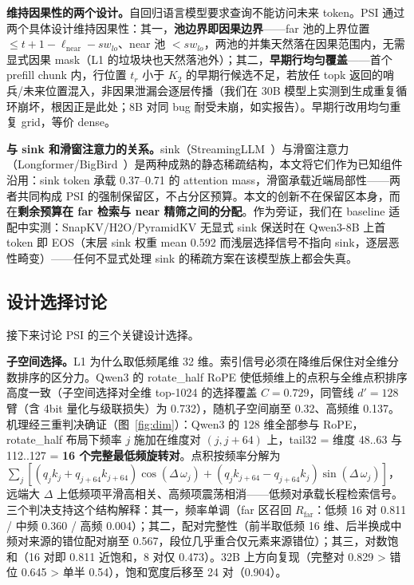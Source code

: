 \documentclass[11pt]{article}
\begin{document}
\textbf{维持因果性的两个设计。}自回归语言模型要求查询不能访问未来 token。PSI 通过两个具体设计维持因果性：其一，\textbf{池边界即因果边界}——far 池的上界位置 $\leq t+1-\ell_{\mathrm{near}}-sw_{lo}$、near 池 $< sw_{lo}$，两池的并集天然落在因果范围内，无需显式因果 mask（L1 的垃圾块也天然落池外）；其二，\textbf{早期行均匀覆盖}——首个 prefill chunk 内，行位置 $t_r$ 小于 $K_2$ 的早期行候选不足，若放任 topk 返回的哨兵/未来位置混入，非因果泄漏会逐层传播（我们在 30B 模型上实测到生成重复循环崩坏，根因正是此处；8B 对同 bug 耐受未崩，如实报告）。早期行改用均匀重复 grid，等价 dense。

\textbf{与 sink 和滑窗注意力的关系。}sink（StreamingLLM~\cite{streamingllm}）与滑窗注意力（Longformer/BigBird~\cite{longformer,bigbird}）是两种成熟的静态稀疏结构，本文将它们作为已知组件沿用：sink token 承载 0.37--0.71 的 attention mass，滑窗承载近端局部性——两者共同构成 PSI 的强制保留区，不占分区预算。本文的创新不在保留区本身，而在\textbf{剩余预算在 far 检索与 near 精筛之间的分配}。作为旁证，我们在 baseline 适配中实测：SnapKV/H2O/PyramidKV 无显式 sink 保送时在 Qwen3-8B 上首 token 即 EOS（末层 sink 权重 mean 0.592 而浅层选择信号不指向 sink，逐层恶性畸变）——任何不显式处理 sink 的稀疏方案在该模型族上都会失真。

\subsection{设计选择讨论}

接下来讨论 PSI 的三个关键设计选择。

\textbf{子空间选择。}L1 为什么取低频尾维 32 维。索引信号必须在降维后保住对全维分数排序的区分力。Qwen3 的 rotate\_half RoPE 使低频维上的点积与全维点积排序高度一致（子空间选择对全维 top-1024 的选择覆盖 $C{=}0.729$，同管线 $d'{=}128$ 臂（含 4bit 量化与级联损失）为 0.732），随机子空间崩至 0.32、高频维 0.137。机理经三重判决确证（图~\ref{fig:dim}）：Qwen3 的 128 维全部参与 RoPE，rotate\_half 布局下频率 $j$ 施加在维度对 $(j, j{+}64)$ 上，tail32 = 维度 48..63 与 112..127 = \textbf{16 个完整最低频旋转对}。点积按频率分解为 $\sum_j [(q_j k_j + q_{j+64} k_{j+64})\cos(\Delta\,\omega_j) + (q_j k_{j+64} - q_{j+64} k_j)\sin(\Delta\,\omega_j)]$，远端大 $\Delta$ 上低频项平滑高相关、高频项震荡相消——低频对承载长程检索信号。三个判决支持这个结构解释：其一，频率单调（far 区召回 $R_{\mathrm{far}}$：低频 16 对 0.811 / 中频 0.360 / 高频 0.004）；其二，配对完整性（前半取低频 16 维、后半换成中频对来源的错位配对崩至 0.567，段位几乎重合仅元素来源错位）；其三，对数饱和（16 对即 0.811 近饱和，8 对仅 0.473）。32B 上方向复现（完整对 0.829 > 错位 0.645 > 单半 0.54），饱和宽度后移至 24 对（0.904）。
\end{document}

